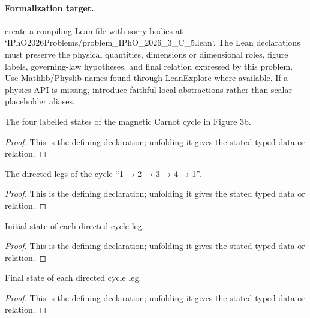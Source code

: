 \paragraph{Formalization target.}
create a compiling Lean file with sorry bodies at `IPhO2026Problems/problem\_IPhO\_2026\_3\_C\_5.lean`. The Lean declarations must preserve the physical quantities, dimensions or dimensional roles, figure labels, governing-law hypotheses, and final relation expressed by this problem.
Use Mathlib/Physlib names found through LeanExplore where available. If a physics API is missing, introduce faithful local abstractions rather than scalar placeholder aliases.

\begin{definition}[CycleState]
  \label{decl:physics:IPhO_2026_3_C_5:CycleState}
  The four labelled states of the magnetic Carnot cycle in Figure 3b.
\end{definition}
\begin{proof}
  This is the defining declaration; unfolding it gives the stated typed data or relation.
\end{proof}

\begin{definition}[CycleLeg]
  \label{decl:physics:IPhO_2026_3_C_5:CycleLeg}
  The directed legs of the cycle “1 → 2 → 3 → 4 → 1”.
\end{definition}
\begin{proof}
  This is the defining declaration; unfolding it gives the stated typed data or relation.
\end{proof}

\begin{definition}
  \label{decl:physics:IPhO_2026_3_C_5:CycleLeg:startState}
  Initial state of each directed cycle leg.
\end{definition}
\begin{proof}
  This is the defining declaration; unfolding it gives the stated typed data or relation.
\end{proof}

\begin{definition}
  \label{decl:physics:IPhO_2026_3_C_5:CycleLeg:endState}
  Final state of each directed cycle leg.
\end{definition}
\begin{proof}
  This is the defining declaration; unfolding it gives the stated typed data or relation.
\end{proof}

